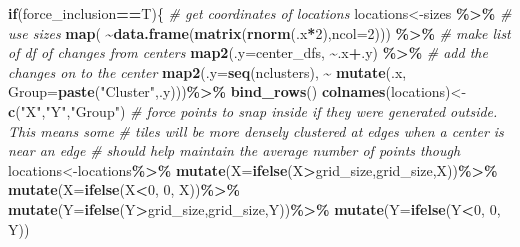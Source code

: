 \documentclass[
]{article}
\newenvironment{Shaded}{\begin{snugshade}}{\end{snugshade}}
\newcommand{\AttributeTok}[1]{\textcolor[rgb]{0.13,0.29,0.53}{#1}}
\newcommand{\CommentTok}[1]{\textcolor[rgb]{0.56,0.35,0.01}{\textit{#1}}}
\newcommand{\ControlFlowTok}[1]{\textcolor[rgb]{0.13,0.29,0.53}{\textbf{#1}}}
\newcommand{\DecValTok}[1]{\textcolor[rgb]{0.00,0.00,0.81}{#1}}
\newcommand{\FunctionTok}[1]{\textcolor[rgb]{0.13,0.29,0.53}{\textbf{#1}}}
\newcommand{\NormalTok}[1]{#1}
\newcommand{\OtherTok}[1]{\textcolor[rgb]{0.56,0.35,0.01}{#1}}
\newcommand{\SpecialCharTok}[1]{\textcolor[rgb]{0.81,0.36,0.00}{\textbf{#1}}}
\newcommand{\StringTok}[1]{\textcolor[rgb]{0.31,0.60,0.02}{#1}}
\begin{document}
\begin{Shaded}
\begin{Highlighting}[]
  \ControlFlowTok{if}\NormalTok{(force\_inclusion}\SpecialCharTok{==}\NormalTok{T)\{}
    \CommentTok{\# get coordinates of locations}
\NormalTok{    locations}\OtherTok{\textless{}{-}}\NormalTok{sizes }\SpecialCharTok{\%\textgreater{}\%} \CommentTok{\# use sizes}
      \FunctionTok{map}\NormalTok{( }\SpecialCharTok{\textasciitilde{}}\FunctionTok{data.frame}\NormalTok{(}\FunctionTok{matrix}\NormalTok{(}\FunctionTok{rnorm}\NormalTok{(.x}\SpecialCharTok{*}\DecValTok{2}\NormalTok{),}\AttributeTok{ncol=}\DecValTok{2}\NormalTok{))) }\SpecialCharTok{\%\textgreater{}\%} \CommentTok{\# make list of df of changes from centers}
      \FunctionTok{map2}\NormalTok{(}\AttributeTok{.y=}\NormalTok{center\_dfs, }\SpecialCharTok{\textasciitilde{}}\NormalTok{.x}\SpecialCharTok{+}\NormalTok{.y) }\SpecialCharTok{\%\textgreater{}\%} \CommentTok{\# add the changes on to the center}
      \FunctionTok{map2}\NormalTok{(}\AttributeTok{.y=}\FunctionTok{seq}\NormalTok{(nclusters), }\SpecialCharTok{\textasciitilde{}} \FunctionTok{mutate}\NormalTok{(.x, }\AttributeTok{Group=}\FunctionTok{paste}\NormalTok{(}\StringTok{"Cluster"}\NormalTok{,.y)))}\SpecialCharTok{\%\textgreater{}\%}
      \FunctionTok{bind\_rows}\NormalTok{()}
    \FunctionTok{colnames}\NormalTok{(locations)}\OtherTok{\textless{}{-}}\FunctionTok{c}\NormalTok{(}\StringTok{"X"}\NormalTok{,}\StringTok{"Y"}\NormalTok{,}\StringTok{"Group"}\NormalTok{)}
    \CommentTok{\# force points to snap inside if they were generated outside. This means some}
    \CommentTok{\# tiles will be more densely clustered at edges when a center is near an edge}
    \CommentTok{\# should help maintain the average number of points though}
\NormalTok{    locations}\OtherTok{\textless{}{-}}\NormalTok{locations}\SpecialCharTok{\%\textgreater{}\%}
      \FunctionTok{mutate}\NormalTok{(}\AttributeTok{X=}\FunctionTok{ifelse}\NormalTok{(X}\SpecialCharTok{\textgreater{}}\NormalTok{grid\_size,grid\_size,X))}\SpecialCharTok{\%\textgreater{}\%}
      \FunctionTok{mutate}\NormalTok{(}\AttributeTok{X=}\FunctionTok{ifelse}\NormalTok{(X}\SpecialCharTok{\textless{}}\DecValTok{0}\NormalTok{, }\DecValTok{0}\NormalTok{, X))}\SpecialCharTok{\%\textgreater{}\%}
      \FunctionTok{mutate}\NormalTok{(}\AttributeTok{Y=}\FunctionTok{ifelse}\NormalTok{(Y}\SpecialCharTok{\textgreater{}}\NormalTok{grid\_size,grid\_size,Y))}\SpecialCharTok{\%\textgreater{}\%}
      \FunctionTok{mutate}\NormalTok{(}\AttributeTok{Y=}\FunctionTok{ifelse}\NormalTok{(Y}\SpecialCharTok{\textless{}}\DecValTok{0}\NormalTok{, }\DecValTok{0}\NormalTok{, Y))}
      

\end{Highlighting}
\end{Shaded}
\end{document}
